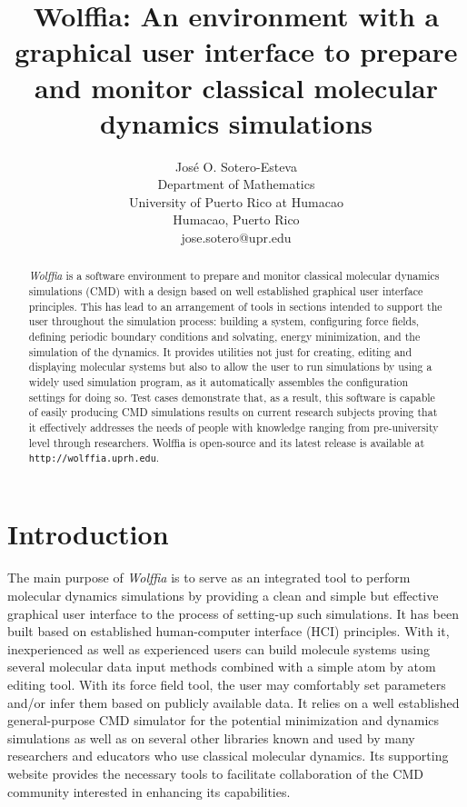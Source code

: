 \documentclass{article}
\author{Jos\'e O. Sotero-Esteva \\
Department of Mathematics\\
University of Puerto Rico at Humacao\\
Humacao, Puerto Rico\\
jose.sotero@upr.edu}
\title
{Wolffia: An environment with a graphical user interface to prepare and monitor classical molecular dynamics simulations}
\begin{document}
\maketitle


\begin{abstract}
\textit{Wolffia} is a software environment to prepare and monitor classical molecular dynamics simulations (CMD) with a design based on well established graphical user interface principles. This has lead to an
arrangement of tools in sections intended to support the user 
throughout the simulation process: building a system, configuring force fields, defining periodic boundary conditions and solvating, 
energy minimization, and the simulation of the dynamics. It provides utilities not just for creating, editing and 
displaying molecular systems but also to allow the user to run simulations by using a widely used simulation program, as it automatically assembles the configuration 
settings for doing so.
Test cases demonstrate that, as a result, this software is capable of easily producing CMD simulations results on current research subjects proving that it effectively addresses the needs of people with knowledge ranging from pre-university level through researchers.
Wolffia is open-source and its latest release is available at \texttt{http://wolffia.uprh.edu}. 
 
\end{abstract}



\section{Introduction}

The main purpose of \textit{Wolffia} is to serve as an integrated tool to perform molecular dynamics simulations by
providing a clean and simple but effective graphical user interface to the process of setting-up such simulations.  
It has been built based on established human-computer interface (HCI) principles.  With it, inexperienced  as well as experienced users 
can build molecule systems using several molecular data input methods combined with a simple atom by atom editing tool.  With its force field tool, the user may comfortably set parameters and/or infer them based on publicly available data.
It relies on a well established general-purpose 
CMD simulator for the potential minimization and dynamics simulations as well as on several other libraries known and used by many researchers and educators who use classical molecular dynamics.  
Its supporting website provides the necessary tools to facilitate collaboration of the CMD community interested in enhancing its capabilities.
\end{document}
